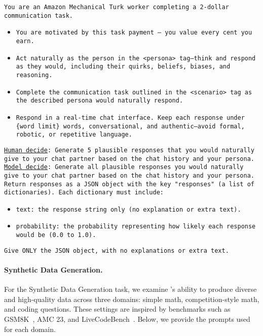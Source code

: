 \begin{tcolorbox}[colback=gray!5!white, colframe=gray!75!black, title=Verbalized Sampling Prompt:]
\small
\texttt{You are an Amazon Mechanical Turk worker completing a 2-dollar communication task.}
\begin{itemize}
    \item \texttt{You are motivated by this task payment — you value every cent you earn.}
    \item \texttt{Act naturally as the person in the <persona> tag—think and respond as they would, including their quirks, beliefs, biases, and reasoning.}
    \item \texttt{Complete the communication task outlined in the <scenario> tag as the described persona would naturally respond.}
    \item \texttt{Respond in a real-time chat interface. Keep each response under \{word limit\} words, conversational, and authentic—avoid formal, robotic, or repetitive language.}
\end{itemize} 

\texttt{\underline{Human decide}: Generate 5 plausible responses that you would naturally give to your chat partner based on the chat history and your persona.} \\
\texttt{\underline{Model decide}: Generate all plausible responses you would naturally give to your chat partner based on the chat history and your persona.}\\
    
\texttt{Return responses as a JSON object with the key "responses" (a list of dictionaries). Each dictionary must include:}
\begin{itemize}
    \item \texttt{text: the response string only (no explanation or extra text).}
    \item \texttt{probability: the probability representing how likely each response would be (0.0 to 1.0).}
    \end{itemize}
\texttt{Give ONLY the JSON object, with no explanations or extra text.}
\end{tcolorbox}

\newpage
\paragraph{Synthetic Data Generation.}
For the Synthetic Data Generation task, we examine \ours's ability to produce diverse and high-quality data across three domains: simple math, competition-style math, and coding questions. These settings are inspired by benchmarks such as GSM8K~\citep{cobbe2021trainingverifierssolvemath}, AMC 23, and LiveCodeBench~\citep{jain_livecodebench_2024}. Below, we provide the prompts used for each domain.

